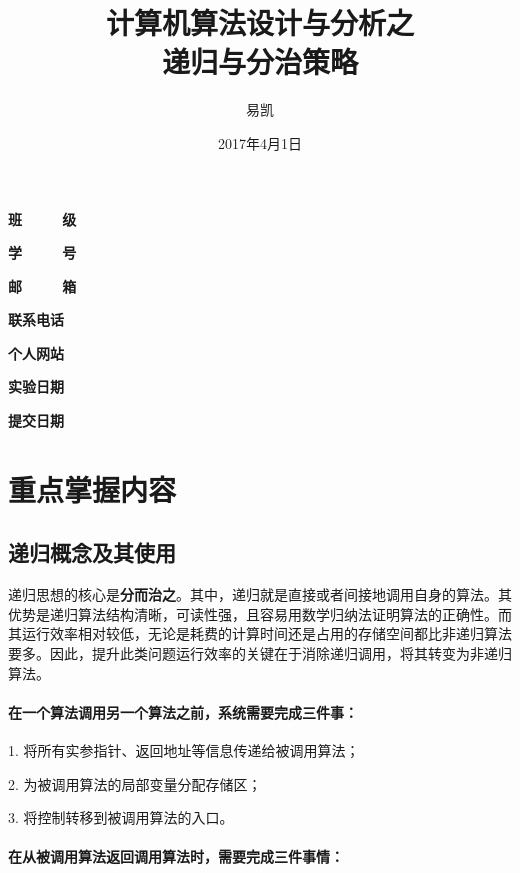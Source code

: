 \documentclass[UTF8]{ctexart}
\title{\Huge{计算机算法设计与分析之\\ 递归与分治策略}}
\author{\Huge{易凯}}
\date{\Huge{2017年4月1日}}
\begin{document}
	\maketitle
	\vspace{35mm}
	\begin{flushright}
	\Large{
  	\textbf{班\ \ \ \ \ 级} 

  	\textbf{学\ \ \ \ \ 号} 

  	\textbf{邮\ \ \ \ \ 箱} 

  	\textbf{联系电话} 

  	\textbf{个人网站} 

	
	  \textbf{实验日期} 

  	\textbf{提交日期} 
  	}
  	\end{flushright}

  	\newpage
  	\tableofcontents
  	\newpage

    \section{重点掌握内容}
    \subsection{递归概念及其使用}
    
    递归思想的核心是\textbf{分而治之}。其中，递归就是直接或者间接地调用自身的算法。其优势是递归算法结构清晰，可读性强，且容易用数学归纳法证明算法的正确性。而其运行效率相对较低，无论是耗费的计算时间还是占用的存储空间都比非递归算法要多。因此，提升此类问题运行效率的关键在于消除递归调用，将其转变为非递归算法。
    
    \paragraph{在一个算法调用另一个算法之前，系统需要完成三件事：}
    
    1. 将所有实参指针、返回地址等信息传递给被调用算法；
    
    2. 为被调用算法的局部变量分配存储区；
    
    3. 将控制转移到被调用算法的入口。
    
    \paragraph{在从被调用算法返回调用算法时，需要完成三件事情：}
    
\end{document}
